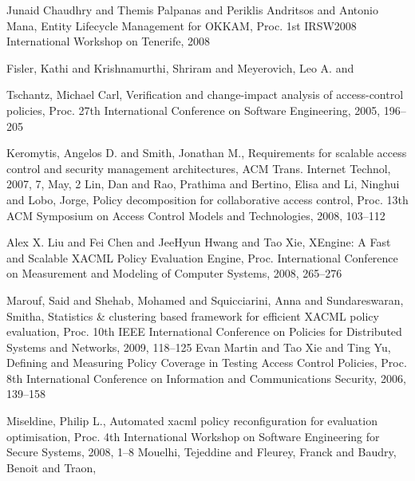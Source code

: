 \documentclass{acm_proc_article-sp}
\begin{document}
%


%
%












\begin{thebibliography}{1}


Junaid Chaudhry and Themis Palpanas and Periklis Andritsos and Antonio
	Mana,
Entity Lifecycle Management for OKKAM,
Proc. 1st IRSW2008 International Workshop on Tenerife,
2008

Fisler, Kathi and Krishnamurthi, Shriram and Meyerovich, Leo A. and

	Tschantz, Michael Carl,
Verification and change-impact analysis of access-control policies,
Proc. 27th International Conference on Software Engineering,
2005,
196--205

Keromytis, Angelos D. and Smith, Jonathan M.,
Requirements for scalable access control and security management
	architectures,
ACM Trans. Internet Technol,
2007,
7,
May,
2
Lin, Dan and Rao, Prathima and Bertino, Elisa and Li, Ninghui and
	Lobo, Jorge,
Policy decomposition for collaborative access control,
Proc. 13th ACM Symposium on Access Control Models and Technologies,
2008,
103--112

Alex X. Liu and Fei Chen and JeeHyun Hwang and Tao Xie,
XEngine: A Fast and Scalable {XACML} Policy Evaluation Engine,
Proc. International Conference on Measurement and Modeling of Computer
	Systems,
2008,
265--276

Marouf, Said and Shehab, Mohamed and Squicciarini, Anna and Sundareswaran,
	Smitha,
Statistics \& clustering based framework for efficient XACML policy
	evaluation,
Proc. 10th IEEE International Conference on Policies for Distributed
	Systems and Networks,
2009,
118--125
Evan Martin and Tao Xie and Ting Yu,
Defining and Measuring Policy Coverage in Testing Access Control
	Policies,
Proc. 8th International Conference on Information and Communications
	Security,
2006,
139--158

Miseldine, Philip L.,
Automated xacml policy reconfiguration for evaluation optimisation,
Proc. 4th International Workshop on Software Engineering for Secure
	Systems,
2008,
1--8
Mouelhi, Tejeddine and Fleurey, Franck and Baudry, Benoit and Traon,


\end{thebibliography}
\end{document}

